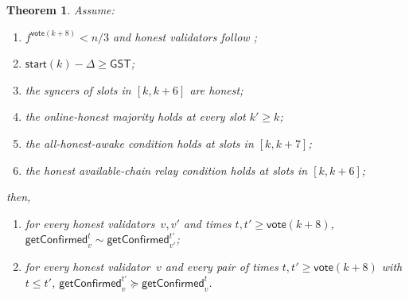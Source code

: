 \documentclass{article}
\newcommand{\start}{\mathsf{start}}
\newcommand{\vote}{\mathsf{vote}}
\newcommand{\getConfirmed}{\textsf{getConfirmed}\xspace}
\theoremstyle{plain}
\newtheorem{theorem}{Theorem}
\theoremstyle{definition}
\theoremstyle{remark}
\newcommand{\GST}{\ensuremath{\mathsf{GST}}}
\newcommand{\OHM}{online-honest majority\xspace}
\newcommand{\HAR}{honest available-chain relay\xspace}
\newcommand{\AHA}{all-honest-awake\xspace}
\begin{document}
\begin{theorem}
Assume:
\begin{enumerate}
  \item $f^{\vote(k+8)} < n/3$ and honest validators follow ;
  \item $\start(k) - \Delta \geq \GST$;
  \item the syncers of slots in $[k, k+6]$ are honest;
  \item the \OHM holds at every slot $k' \geq k$;
  \item the \AHA condition holds at slots in $[k, k+7]$;
  \item the \HAR condition holds at slots in $[k, k+6]$;
\end{enumerate}
then,
\begin{enumerate}
  \item for every honest validators~$v,v'$ and times $t, t' \geq \vote(k+8)$, $\getConfirmed_v^{t} \sim \getConfirmed_{v'}^{t'}$;
  \item for every honest validator~$v$ and every pair of times $t, t' \geq \vote(k+8)$ with $t \leq t'$, $\getConfirmed_v^{t'} \succeq \getConfirmed_v^t$.
\end{enumerate}
\end{theorem}
\end{document}
